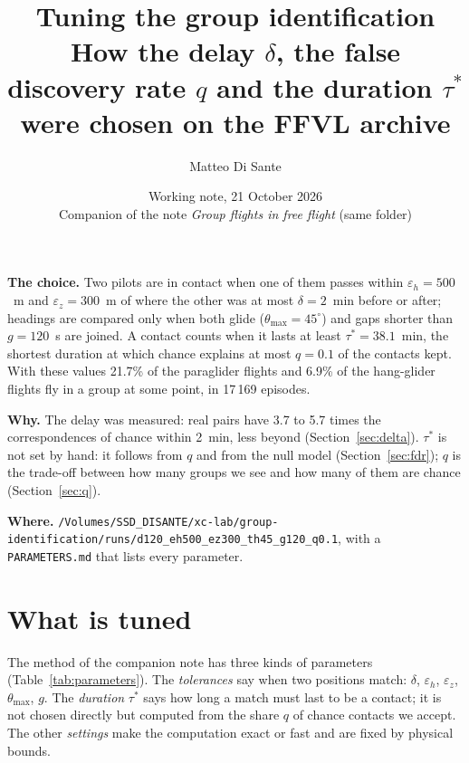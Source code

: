 \documentclass[11pt,a4paper]{article}
\title{\textbf{Tuning the group identification}\\[4pt]
  \large How the delay $\delta$, the false discovery rate $q$ and the duration $\tau^*$\\
  were chosen on the FFVL archive}
\author{Matteo Di Sante}
\date{Working note, 21 October 2026\\[2pt]
  \small Companion of the note \emph{Group flights in free flight} (same folder)}
\begin{document}
\maketitle

\begin{summary}
\textbf{The choice.} Two pilots are in contact when one of them passes within
$\varepsilon_h=500$~m and $\varepsilon_z=300$~m of where the other was at most
$\delta=2$~min before or after; headings are compared only when both glide
($\theta_{\max}=45^\circ$) and gaps shorter than $g=120$~s are joined. A contact counts
when it lasts at least $\tau^*=38.1$~min, the shortest duration at which chance explains at
most $q=0.1$ of the contacts kept. With these values 21.7\% of the paraglider flights and
6.9\% of the hang-glider flights fly in a group at some point, in 17\,169 episodes.

\textbf{Why.} The delay was measured: real pairs have 3.7 to 5.7 times the correspondences
of chance within 2~min, less beyond (Section~\ref{sec:delta}). $\tau^*$ is not set by
hand: it follows from $q$ and from the null model (Section~\ref{sec:fdr}); $q$ is the
trade-off between how many groups we see and how many of them are chance
(Section~\ref{sec:q}).

\textbf{Where.} \nolinkurl{/Volumes/SSD_DISANTE/xc-lab/group-identification/runs/d120_eh500_ez300_th45_g120_q0.1},
with a \texttt{PARAMETERS.md} that lists every parameter.
\end{summary}

\tableofcontents

\section{What is tuned}

The method of the companion note has three kinds of parameters
(Table~\ref{tab:parameters}). The \emph{tolerances} say when two positions match:
$\delta$, $\varepsilon_h$, $\varepsilon_z$, $\theta_{\max}$, $g$. The \emph{duration}
$\tau^*$ says how long a match must last to be a contact; it is not chosen directly but
computed from the share $q$ of chance contacts we accept. The other \emph{settings} make the
computation exact or fast and are fixed by physical bounds.
\end{document}
